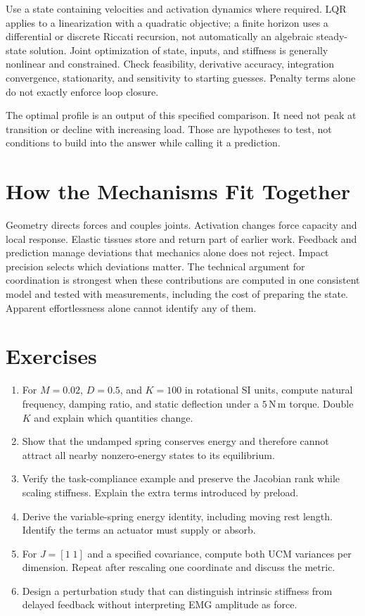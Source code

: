 Use a state containing velocities and activation dynamics where required.
LQR applies to a linearization with a quadratic objective; a finite horizon
uses a differential or discrete Riccati recursion, not automatically an
algebraic steady-state solution. Joint optimization of state, inputs, and
stiffness is generally nonlinear and constrained. Check feasibility, derivative
accuracy, integration convergence, stationarity, and sensitivity to starting
guesses. Penalty terms alone do not exactly enforce loop closure.

The optimal profile is an output of this specified comparison. It need not
peak at transition or decline with increasing load. Those are hypotheses to
test, not conditions to build into the answer while calling it a prediction.

\section{How the Mechanisms Fit Together}

Geometry directs forces and couples joints. Activation changes force capacity
and local response. Elastic tissues store and return part of earlier work.
Feedback and prediction manage deviations that mechanics alone does not reject.
Impact precision selects which deviations matter. The technical argument for
coordination is strongest when these contributions are computed in one
consistent model and tested with measurements, including the cost of preparing
the state. Apparent effortlessness alone cannot identify any of them.

\section*{Exercises}
\begin{enumerate}
\item For $M=0.02$, $D=0.5$, and $K=100$ in rotational SI units,
compute natural frequency, damping ratio, and static deflection under a
$5\,\mathrm{N\,m}$ torque. Double $K$ and explain which quantities change.
\item Show that the undamped spring conserves energy and therefore cannot
attract all nearby nonzero-energy states to its equilibrium.
\item Verify the task-compliance example and preserve the Jacobian rank while
scaling stiffness. Explain the extra terms introduced by preload.
\item Derive the variable-spring energy identity, including moving rest length.
Identify the terms an actuator must supply or absorb.
\item For $J=[1\;1]$ and a specified covariance, compute both UCM variances
per dimension. Repeat after rescaling one coordinate and discuss the metric.
\item Design a perturbation study that can distinguish intrinsic stiffness
from delayed feedback without interpreting EMG amplitude as force.
\end{enumerate}
